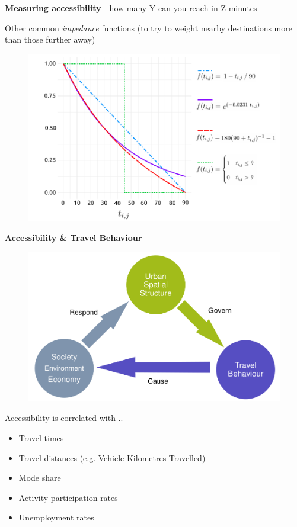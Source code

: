 \documentclass[aspectratio=169]{beamer}
\begin{document}
\begin{frame}
	
	\textbf{Measuring accessibility} - how many Y can you reach in Z minutes
	
	\vspace{3mm}
	
	Other common \textit{impedance} functions (to try to weight nearby destinations more than those further away)
	
	\begin{figure}
		\centering
		\includegraphics[width=0.76\linewidth]{images/gravity.pdf}
	\end{figure}

	
	
\end{frame}




\begin{frame}
	
	\textbf{Accessibility \& Travel Behaviour}
	
	\begin{figure}
		\centering
		\includegraphics[width=0.56\linewidth]{images/big_links.png}
	\end{figure}
	
	
	Accessibility is correlated with ..
	\begin{itemize}
		\item Travel times
		\item Travel distances (e.g. Vehicle Kilometres Travelled)
		\item Mode share
		\item Activity participation rates
		\item Unemployment rates
	\end{itemize}
	
\end{frame}
\end{document}
